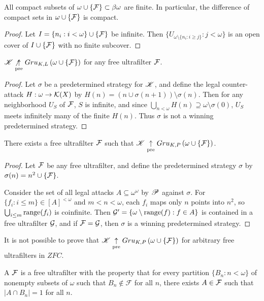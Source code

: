 \begin{lem}
  All compact subsets of $\omega\cup\{\mathcal{F}\}\subset\beta\omega$ are finite.
  In particular, the difference of compact sets in $\omega\cup\{\mathcal{F}\}$
  is compact.
\end{lem}

\begin{proof}
  Let $I=\{n_i:i<\omega\}\cup\{\mathcal{F}\}$ be infinite.
  Then $\{U_{\omega\setminus\{n_i:i\geq j\}}:j<\omega\}$ is an open cover of
  $I\cup\{\mathcal{F}\}$ with no finite subcover.
\end{proof}

\begin{thm}
  $\mathscr{K}\not\underset{\text{pre}}{\uparrow} Gru_{K,L}\left({\omega\cup\{\mathcal{F}\}}\right)$ for any free
  ultrafilter $\mathcal{F}$.
\end{thm}

\begin{proof}
  Let $\sigma$ be a predetermined strategy for $\mathscr{K}$, and define the legal
  counter-attack $H:\omega\to\mathcal{K}(X)$ by
  $H(n)=(n\cup\sigma(n+1))\setminus\sigma(n)$. Then for any neighborhood
  $U_S$ of $\mathcal{F}$, $S$ is infinite, and since
  $\bigcup_{n<\omega} H(n)\supseteq\omega\setminus\sigma(0)$, $U_S$ meets
  infinitely many of the finite $H(n)$. Thus $\sigma$ is not a winning
  predetermined strategy.
\end{proof}

\begin{thm}
  There exists a free ultrafilter $\mathcal{F}$ such that
  $\mathscr{K}\underset{\text{pre}}{\uparrow} Gru_{K,P}\left({\omega\cup\{\mathcal{F}\}}\right)$.
\end{thm}

\begin{proof}
  Let $\mathcal{F}$ be any free ultrafilter, and
  define the predetermined strategy $\sigma$ by
  $\sigma(n)=n^2\cup\{\mathcal{F}\}$.

  Consider the set of all legal attacks $A\subseteq\omega^\omega$ by
  $\mathscr{P}$ against $\sigma$. For $\{f_i:i\leq m\}\in [A]^{<\omega}$ and
  $m<n<\omega$, each $f_i$ maps only $n$ points into $n^2$, so
  $\bigcup_{i\leq m}\text{range}(f_i)$ is coinfinite.
  Then $\mathcal{G}'=\{\omega\setminus\text{range}(f) : f\in A\}$ is contained in a free
  ultrafilter $\mathcal{G}$, and if $\mathcal{F}=\mathcal{G}$, then $\sigma$ is a
  winning predetermined strategy.
\end{proof}

It is not possible to prove that $\mathscr{K}\underset{\text{pre}}{\uparrow} Gru_{K,P}\left({\omega\cup\{\mathcal{F}\}}\right)$
for arbitrary free ultrafilters in $ZFC$.

\begin{defn}
  A  $\mathcal{F}$ is a free ultrafilter with the
  property that for every
  partition $\{B_n : n < \omega\}$ of nonempty subsets of $\omega$ such that
  $B_n \not\in \mathcal{F}$ for all $n$, there exists $A \in \mathcal{F}$ such
  that $|A \cap B_n|=1$ for all $n$.
\end{defn}

